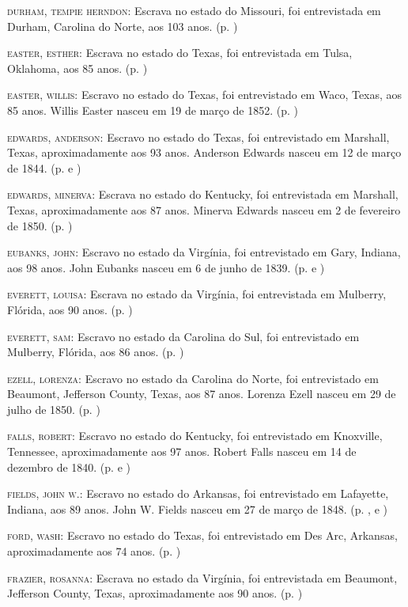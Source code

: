 \begin{Parskip}
\textsc{durham, tempie herndon:} Escrava no estado do Missouri, foi
entrevistada em Durham, Carolina do Norte, aos 103 anos. (p. \pageref{ref77})

\textsc{easter, esther:} Escrava no estado do Texas, foi entrevistada em
Tulsa, Oklahoma, aos 85 anos. (p. \pageref{ref78})

\textsc{easter, willis:} Escravo no estado do Texas, foi entrevistado em
Waco, Texas, aos 85 anos. Willis Easter nasceu em 19 de março de 1852. (p. \pageref{ref79})

\textsc{edwards, anderson:} Escravo no estado do Texas, foi entrevistado
em Marshall, Texas, aproximadamente aos 93 anos. Anderson Edwards nasceu
em 12 de março de 1844. (p. \pageref{ref80} e \pageref{ref81})

\textsc{edwards, minerva:} Escrava no estado do Kentucky, foi
entrevistada em Marshall, Texas, aproximadamente aos 87 anos. Minerva
Edwards nasceu em 2 de fevereiro de 1850. (p. \pageref{ref82})

\textsc{eubanks, john:} Escravo no estado da Virgínia, foi entrevistado
em Gary, Indiana, aos 98 anos. John Eubanks nasceu em 6 de junho de
1839. (p. \pageref{ref83} e \pageref{ref84})

\textsc{everett, louisa:} Escrava no estado da Virgínia, foi
entrevistada em Mulberry, Flórida, aos 90 anos. (p. \pageref{ref85})

\textsc{everett, sam:} Escravo no estado da Carolina do Sul, foi
entrevistado em Mulberry, Flórida, aos 86 anos. (p. \pageref{ref85})

\textsc{ezell, lorenza:} Escravo no estado da Carolina do Norte, foi
entrevistado em Beaumont, Jefferson County, Texas, aos 87 anos. Lorenza
Ezell nasceu em 29 de julho de 1850. (p. \pageref{ref86})

\textsc{falls, robert:} Escravo no estado do Kentucky, foi entrevistado
em Knoxville, Tennessee, aproximadamente aos 97 anos. Robert Falls
nasceu em 14 de dezembro de 1840. (p. \pageref{ref87} e \pageref{ref88})

\textsc{fields, john w.:} Escravo no estado do Arkansas, foi
entrevistado em Lafayette, Indiana, aos 89 anos. John W. Fields nasceu
em 27 de março de 1848. (p. \pageref{ref89}, \pageref{ref90} e \pageref{ref91})

\textsc{ford, wash:} Escravo no estado do Texas, foi entrevistado em Des
Arc, Arkansas, aproximadamente aos 74 anos. (p. \pageref{ref92})

\textsc{frazier, rosanna:} Escrava no estado da Virgínia, foi
entrevistada em Beaumont, Jefferson County, Texas, aproximadamente aos
90 anos. (p. \pageref{ref93})


\end{Parskip}
